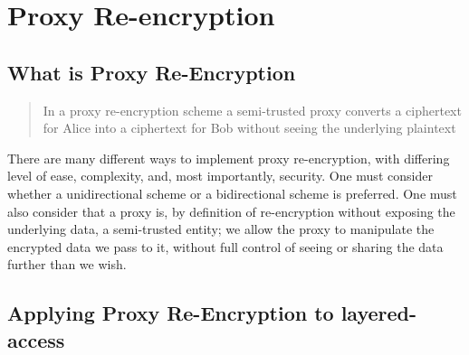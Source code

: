 \section{Proxy Re-encryption}

\subsection{What is Proxy Re-Encryption}

\blockquote{
  In a proxy re-encryption scheme a semi-trusted proxy converts a ciphertext for Alice into a ciphertext for Bob without seeing the underlying plaintext
}\autocite{greenateniese:2006:article}

There are many different ways to implement proxy re-encryption, with differing level of ease, complexity, and, most importantly, security. One must consider whether a unidirectional scheme or a bidirectional scheme is preferred. One must also consider that a proxy is, by definition of re-encryption without exposing the underlying data, a semi-trusted entity; we allow the proxy to manipulate the encrypted data we pass to it, without full control of seeing or sharing the data further than we wish.

\subsection{Applying Proxy Re-Encryption to layered-access}
